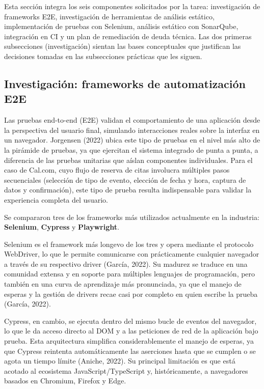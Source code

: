 \documentclass[12pt,a4paper]{article}
\begin{document}
Esta sección integra los seis componentes solicitados por la tarea:
investigación de frameworks E2E, investigación de herramientas de
análisis estático, implementación de pruebas con Selenium,
análisis estático con SonarQube, integración en CI y un plan de
remediación de deuda técnica. Las dos primeras subsecciones
(investigación) sientan las bases conceptuales que justifican las
decisiones tomadas en las subsecciones prácticas que les siguen.


\subsection{Investigación: frameworks de automatización E2E}

Las pruebas end-to-end (E2E) validan el comportamiento de una
aplicación desde la perspectiva del usuario final, simulando
interacciones reales sobre la interfaz en un navegador. Jorgensen
(2022) ubica este tipo de pruebas en el nivel más alto de la
pirámide de pruebas, ya que ejercitan el sistema integrado de punta
a punta, a diferencia de las pruebas unitarias que aíslan
componentes individuales. Para el caso de Cal.com, cuyo flujo de
reserva de citas involucra múltiples pasos secuenciales
(selección de tipo de evento, elección de fecha y hora, captura de
datos y confirmación), este tipo de prueba resulta indispensable
para validar la experiencia completa del usuario.

Se compararon tres de los frameworks más utilizados actualmente en
la industria: \textbf{Selenium}, \textbf{Cypress} y
\textbf{Playwright}.

Selenium es el framework más longevo de los tres y opera mediante el
protocolo WebDriver, lo que le permite comunicarse con prácticamente
cualquier navegador a través de su respectivo driver (García, 2022).
Su madurez se traduce en una comunidad extensa y en soporte para
múltiples lenguajes de programación, pero también en una curva de
aprendizaje más pronunciada, ya que el manejo de esperas y la
gestión de drivers recae casi por completo en quien escribe la
prueba (García, 2022).

Cypress, en cambio, se ejecuta dentro del mismo bucle de eventos del
navegador, lo que le da acceso directo al DOM y a las peticiones de
red de la aplicación bajo prueba. Esta arquitectura simplifica
considerablemente el manejo de esperas, ya que Cypress reintenta
automáticamente las aserciones hasta que se cumplen o se agota un
tiempo límite (Aniche, 2022). Su principal limitación es que está
acotado al ecosistema JavaScript/TypeScript y, históricamente, a
navegadores basados en Chromium, Firefox y Edge.
\end{document}
